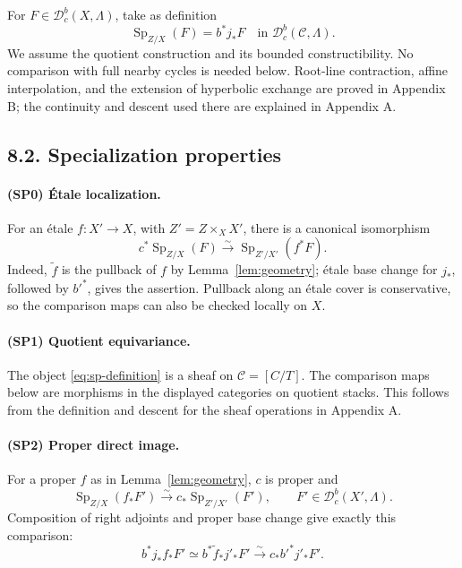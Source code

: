 \documentclass[11pt,a4paper]{article}
\newcommand{\Sp}{\operatorname{Sp}}
\newcommand{\Dc}{\mathcal D^b_c}
\newcommand{\cC}{\mathscr C}
\theoremstyle{notes}
\begin{document}
For $F\in\Dc(X,\Lambda)$, take as definition
\begin{equation}\label{eq:sp-definition}
\boxed{\ \Sp_{Z/X}(F)=b^*j_*F\quad\text{in }\Dc(\cC,\Lambda).\ }
\end{equation}
We assume the quotient construction and its bounded constructibility. No comparison with full nearby cycles is needed below. Root-line contraction, affine interpolation, and the extension of hyperbolic exchange are proved in Appendix B; the continuity and descent used there are explained in Appendix A.

\subsection*{8.2. Specialization properties}

\paragraph{(SP0) Étale localization.}
For an étale $f:X'\to X$, with $Z'=Z\times_X X'$, there is a canonical isomorphism
\[
c^*\Sp_{Z/X}(F)\xrightarrow{\sim}\Sp_{Z'/X'}(f^*F).
\]
Indeed, $\widetilde f$ is the pullback of $f$ by Lemma~\ref{lem:geometry}; étale base change for $j_*$, followed by $b'^*$, gives the assertion. Pullback along an étale cover is conservative, so the comparison maps can also be checked locally on $X$.

\paragraph{(SP1) Quotient equivariance.}
The object \eqref{eq:sp-definition} is a sheaf on $\cC=[C/T]$. The comparison maps below are morphisms in the displayed categories on quotient stacks. This follows from the definition and descent for the sheaf operations in Appendix A.

\paragraph{(SP2) Proper direct image.}
For a proper $f$ as in Lemma~\ref{lem:geometry}, $c$ is proper and
\begin{equation}\label{eq:proper}
\Sp_{Z/X}(f_*F')\xrightarrow{\sim}c_*\Sp_{Z'/X'}(F'),
\qquad F'\in\Dc(X',\Lambda).
\end{equation}
Composition of right adjoints and proper base change give exactly this comparison:
\[
b^*j_*f_*F'\simeq b^*\widetilde f_*j'_*F'
\xrightarrow{\sim}c_*b'^*j'_*F'.
\]
\end{document}
